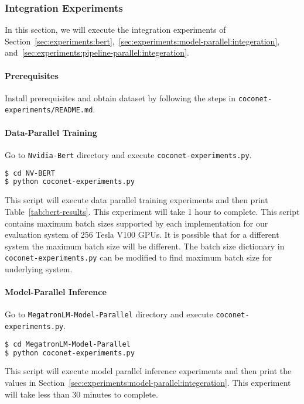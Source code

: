 \subsubsection{Integration Experiments}
\label{appendix:sec-integration}
In this section, we will execute the integration experiments of Section~\ref{sec:experiments:bert},~\ref{sec:experiments:model-parallel:integeration}, and~\ref{sec:experiments:pipeline-parallel:integeration}.

\paragraph{Prerequisites} Install prerequisites and obtain dataset by following the steps in \texttt{coconet-experiments/README.md}.

\paragraph{Data-Parallel Training}
Go to \texttt{Nvidia-Bert} directory and execute \texttt{coconet-experiments.py}.

{\footnotesize
\begin{lstlisting}[language=bash]
$ cd NV-BERT 
$ python coconet-experiments.py
\end{lstlisting}
}

This script will execute data parallel training experiments and then print Table~\ref{tab:bert-results}.
This experiment will take 1 hour to complete.
This script contains maximum batch sizes supported by each implementation for our evaluation system of 256 Tesla V100 GPUs.
It is possible that for a different system the maximum batch size will be different.
The batch size dictionary in \texttt{coconet-experiments.py} can be modified to find maximum batch size for underlying system.

\paragraph{Model-Parallel Inference} 
Go to \texttt{MegatronLM-Model-Parallel} directory and execute \texttt{coconet-experiments.py}.
{\footnotesize
\begin{lstlisting}[language=bash]
$ cd MegatronLM-Model-Parallel
$ python coconet-experiments.py
\end{lstlisting}
}
This script will execute model parallel inference experiments and then print the values in Section~\ref{sec:experiments:model-parallel:integeration}.
This experiment will take less than 30 minutes to complete.

